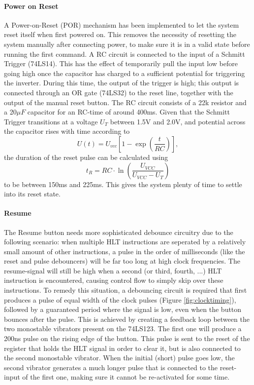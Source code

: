 \paragraph{Power on Reset} A Power-on-Reset (POR) mechanism has been implemented to let the system reset itself when first powered on. This removes the necessity of resetting the system manually after connecting power, to make sure it is in a valid state before running the first command. A RC circuit is connected to the input of a Schmitt Trigger (74LS14). This has the effect of temporarily pull the input low before going high once the capacitor has charged to a sufficient potential for triggering the inverter. During this time, the output of the trigger is high; this output is connected through an OR gate (74LS32) to the reset line, together with the output of the manual reset button. The RC circuit consists of a 22k resistor and a 20$\mu F$ capacitor for an RC-time of around 400ms. Given that the Schmitt Trigger transitions at a voltage $U_T$ between 1.5V and 2.0V, and potential across the capacitor rises with time according to
$$ U(t) = U_{vcc}\left[1-\exp\left(\frac{t}{RC}\right)\right],$$
the duration of the reset pulse can be calculated using
$$ t_R = RC\cdot\ln\left(\frac{U_{VCC}}{U_{VCC}-U_T}\right)$$
to be between 150ms and 225ms. This gives the system plenty of time to settle into its reset state.



\paragraph{Resume} The Resume button needs more sophisticated debounce circuitry due to the following scenario: when multiple HLT instructions are seperated by a relatively small amount of other instructions, a pulse in the order of milliseconds (like the reset and pulse debouncers) will be far too long at high clock frequencies. The resume-signal will still be high when a second (or third, fourth, ...) HLT instruction is encountered, causing control flow to simply skip over these instructions. To remedy this situation, a debouncing circuit is required that first produces a pulse of equal width of the clock pulses (Figure \ref{fig:clocktiming}), followed by a guaranteed period where the signal is low, even when the button bounces after the pulse. This is achieved by creating a feedback loop between the two monostable vibrators present on the 74LS123. The first one will produce a 200ns pulse on the rising edge of the button. This pulse is sent to the reset of the register that holds the HLT signal in order to clear it, but is also connected to the second monostable vibrator. When the initial (short) pulse goes low, the second vibrator generates a much longer pulse that is connected to the reset-input of the first one, making sure it cannot be re-activated for some time.

